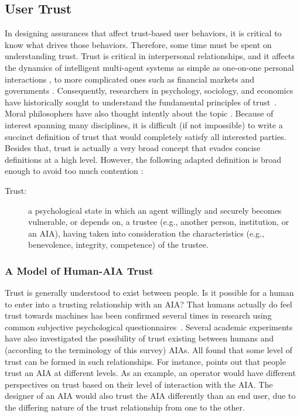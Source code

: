 \subsection{User Trust} \label{sec:trust}
    In designing assurances that affect trust-based user behaviors, it is critical to know what drives those behaviors. Therefore, some time must be spent on understanding trust. Trust is critical in interpersonal relationships, and it affects the dynamics of intelligent multi-agent systems as simple as one-on-one personal interactions  \cite{Lewicki2006-hj}, to more complicated ones such as financial markets and governments \cite{Fukuyama1995-un}. Consequently, researchers in psychology, sociology, and economics have historically sought to understand the fundamental principles of trust~\cite{Gambetta1988-pi}. Moral philosophers have also thought intently about the topic \cite{Baier1986-im}. Because of interest spanning many disciplines, it is difficult (if not impossible) to write a succinct definition of trust that would completely satisfy all interested parties. Besides that, trust is actually a very broad concept that evades concise definitions at a high level. However, the following adapted definition is broad enough to avoid too much contention \cite{McKnight2004-vv}:

    \begin{description}
        \item [Trust:] a psychological state in which an agent willingly and securely becomes vulnerable, or depends on, a trustee (e.g., another person, institution, or an AIA), having taken into consideration the characteristics (e.g., benevolence, integrity, competence) of the trustee.
    \end{description}

    \subsubsection{A Model of Human-AIA Trust}
        Trust is generally understood to exist between people. Is it possible for a human to enter into a trusting relationship with an AIA? That humans actually do feel trust towards machines has been confirmed several times in research using common subjective psychological questionnaires~\cite{Muir1996-gt,Mcknight2011-gv,Riley1996-qm,Bainbridge2011-pl,Salem2015-md,Desai2012-rc, Freedy2007-sg, Kaniarasu2013-ho, Wang2016-id}. Several academic experiments have also investigated the possibility of trust existing between humans and (according to the terminology of this survey) AIAs.  All found that some level of trust can be formed in such relationships. For instance, \citet{Lacher2014-yc} points out that people trust an AIA at different levels. As an example, an operator would have different perspectives on trust based on their level of interaction with the AIA. The designer of an AIA would also trust the AIA differently than an end user, due to the differing nature of the trust relationship from one to the other. 

